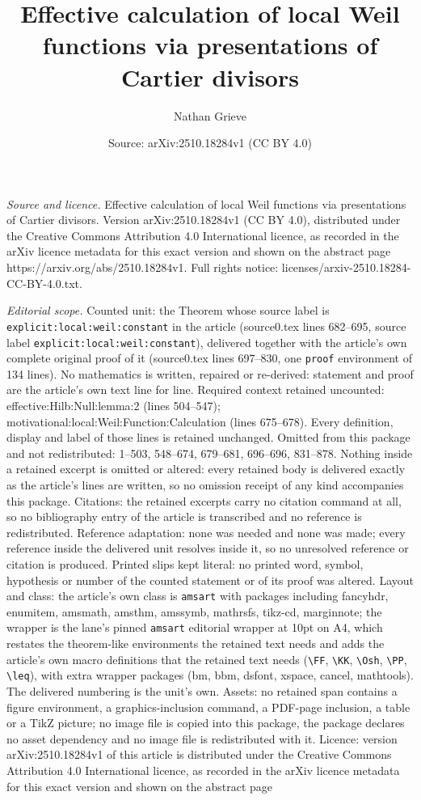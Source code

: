 \documentclass[10pt,a4paper]{amsart}
\title[Effective calculation of local Weil functions via presentati]{Effective calculation of local Weil functions via presentations of Cartier divisors}
\author{Nathan Grieve}
\date{Source: arXiv:2510.18284v1 (CC BY 4.0)}
\begin{document}
\maketitle

\noindent\emph{Source and licence.} Effective calculation of local Weil functions via presentations of Cartier divisors. Version arXiv:2510.18284v1 (CC BY 4.0), distributed under the Creative Commons Attribution 4.0 International licence, as recorded in the arXiv licence metadata for this exact version and shown on the abstract page https://arxiv.org/abs/2510.18284v1. Full rights notice: licenses/arxiv-2510.18284-CC-BY-4.0.txt.\par\smallskip

\noindent\textit{Editorial scope.} Counted unit: the Theorem whose source label is \texttt{explicit:local:weil:constant} in the article (source0.tex lines 682--695, source label \texttt{explicit:local:weil:constant}), delivered together with the article's own complete original proof of it (source0.tex lines 697--830, one \texttt{proof} environment of 134 lines). No mathematics is written, repaired or re-derived: statement and proof are the article's own text line for line. Required context retained uncounted: effective:Hilb:Null:lemma:2 (lines 504--547); motivational:local:Weil:Function:Calculation (lines 675--678). Every definition, display and label of those lines is retained unchanged. Omitted from this package and not redistributed: 1--503, 548--674, 679--681, 696--696, 831--878. Nothing inside a retained excerpt is omitted or altered: every retained body is delivered exactly as the article's lines are written, so no omission receipt of any kind accompanies this package. Citations: the retained excerpts carry no citation command at all, so no bibliography entry of the article is transcribed and no reference is redistributed. Reference adaptation: none was needed and none was made; every reference inside the delivered unit resolves inside it, so no unresolved reference or citation is produced. Printed slips kept literal: no printed word, symbol, hypothesis or number of the counted statement or of its proof was altered. Layout and class: the article's own class is \texttt{amsart} with packages including fancyhdr, enumitem, amsmath, amsthm, amssymb, mathrsfs, tikz-cd, marginnote; the wrapper is the lane's pinned \texttt{amsart} editorial wrapper at 10pt on A4, which restates the theorem-like environments the retained text needs and adds the article's own macro definitions that the retained text needs (\texttt{\textbackslash FF}, \texttt{\textbackslash KK}, \texttt{\textbackslash Osh}, \texttt{\textbackslash PP}, \texttt{\textbackslash leq}), with extra wrapper packages (bm, bbm, dsfont, xspace, cancel, mathtools). The delivered numbering is the unit's own. Assets: no retained span contains a figure environment, a graphics-inclusion command, a PDF-page inclusion, a table or a TikZ picture; no image file is copied into this package, the package declares no asset dependency and no image file is redistributed with it. Licence: version arXiv:2510.18284v1 of this article is distributed under the Creative Commons Attribution 4.0 International licence, as recorded in the arXiv licence metadata for this exact version and shown on the abstract page 
\end{document}
